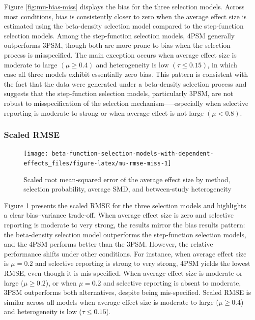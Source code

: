 \documentclass[
  american,
  man, donotrepeattitle,floatsintext]{apa7}
\begin{document}
Figure \ref{fig:mu-bias-miss} displays the bias for the three selection models. Across most conditions, bias is consistently closer to zero when the average effect size is estimated using the beta-density selection model compared to the step-function selection models. Among the step-function selection models, 4PSM generally outperforms 3PSM, though both are more prone to bias when the selection process is misspecified. The main exception occurs when average effect size is moderate to large \((\mu \geq 0.4)\) and heterogeneity is low \((\tau \leq 0.15)\), in which case all three models exhibit essentially zero bias. This pattern is consistent with the fact that the data were generated under a beta-density selection process and suggests that the step-function selection models, particularly 3PSM, are not robust to misspecification of the selection mechanism-----especially when selective reporting is moderate to strong or when average effect is not large \((\mu < 0.8)\).

\subsubsection{Scaled RMSE}\label{scaled-rmse-1}

\begin{figure}
\texttt{[image: beta-function-selection-models-with-dependent-effects\_files/figure-latex/mu-rmse-miss-1]} \caption{Scaled root mean-squared error of the average effect size by method, selection probability, average SMD, and between-study heterogeneity}\label{fig:mu-rmse-miss}
\end{figure}

Figure \ref{fig:mu-rmse-miss} presents the scaled RMSE for the three selection models and highlights a clear bias--variance trade-off. When average effect size is zero and selective reporting is moderate to very strong, the results mirror the bias results pattern: the beta-density selection model outperforms the step-function selection models, and the 4PSM performs better than the 3PSM. However, the relative performance shifts under other conditions. For instance, when average effect size is \(\mu = 0.2\) and selective reporting is strong to very strong, 4PSM yields the lowest RMSE, even though it is mis-specified. When average effect size is moderate or large (\(\mu \geq 0.2\)), or when \(\mu = 0.2\) and selective reporting is absent to moderate, 3PSM outperforms both alternatives, despite being mis-specified. Scaled RMSE is similar across all models when average effect size is moderate to large (\(\mu \geq 0.4\)) and heterogeneity is low (\(\tau \leq 0.15\)).
\end{document}
